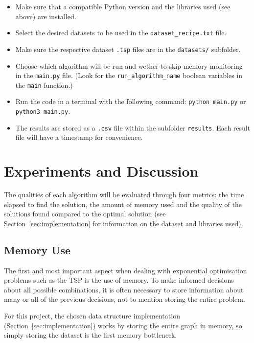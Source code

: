 \documentclass[12pt]{article}
\begin{document}
\begin{itemize}
  \item Make sure that a compatible Python version and the libraries used (see above) are installed.
  \item Select the desired datasets to be used in the \texttt{dataset\_recipe.txt} file.
  \item Make sure the respective dataset \texttt{.tsp} files are in the \texttt{datasets/} subfolder.
  \item Choose which algorithm will be run and wether to skip memory monitoring in the \texttt{main.py} file. (Look for the \texttt{run\_algorithm\_name} boolean variables in the \texttt{main} function.)
  \item Run the code in a terminal with the following command: \texttt{python main.py} or \texttt{python3 main.py}.
  \item The results are stored as a \texttt{.csv} file within the subfolder \texttt{results}. Each result file will have a timestamp for convenience. 
\end{itemize}

\section{Experiments and Discussion} \label{sec:experiments}

The qualities of each algorithm will be evaluated through four metrics: the time elapsed 
to find the solution, the amount of memory used and the quality of the solutions found 
compared to the optimal solution (see Section~\ref{sec:implementation} for information 
on the dataset and libraries used).

\subsection{Memory Use} \label{sec:exp_memory}

The first and most important aspect when dealing with exponential optimisation problems such as 
the TSP is the use of memory. To make informed decisions about all possible combinations, 
it is often necessary to store information about many or all of the previous decisions, not to 
mention storing the entire problem.

For this project, the chosen data structure implementation (Section~\ref{sec:implementation}) works by storing 
the entire graph in memory, so simply storing the dataset is the first memory bottleneck.
\end{document}
